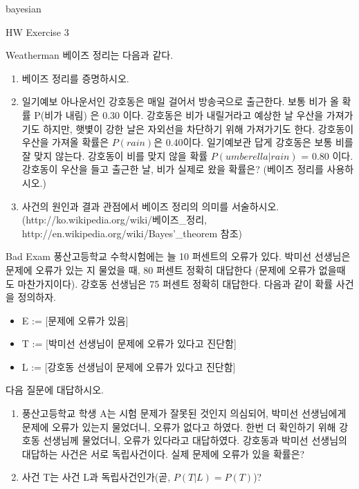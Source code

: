 \begin{edXchapter}{bayesian}

\begin{edXsection}{HW Exercise 3}

\begin{edXvertical}

\begin{edXproblem}{Weatherman}
베이즈 정리는 다음과 같다.
\begin{enumerate}
\item 베이즈 정리를 증명하시오.
\item 일기예보 아나운서인 강호동은 매일 걸어서 방송국으로 출근한다. 보통 비가 올 확률 P(비가 내림) 은  0.30 이다.
강호동은 비가 내릴거라고 예상한 날 우산을 가져가기도 하지만, 햇볓이 강한 날은 자외선을 차단하기 
위해 가져가기도 한다. 강호동이 우산을 가져올 확률은 $P(rain)$은 0.40이다. 일기예보관 답게 강호동은 보통 
비를 잘 맞지 않는다. 강호동이 비를 맞지 않을 확률 $P(umberella | rain)$ = 0.80 이다.
강호동이 우산을 들고 출근한 날, 비가 실제로 왔을 확률은? (베이즈 정리를 사용하시오.)
\item 사건의 원인과 결과 관점에서 베이즈 정리의 의미를 서술하시오.
(http://ko.wikipedia.org/wiki/베이즈_정리, http://en.wikipedia.org/wiki/Bayes'_theorem 참조)
\end{enumerate}
\end{edXproblem}

\begin{edXproblem}{Bad Exam}
풍산고등학교 수학시험에는 늘 10 퍼센트의 오류가 있다. 박미선 선생님은 문제에 오류가 있는 지 물었을 때,
80 퍼센트 정확히 대답한다 (문제에 오류가 없을때도 마찬가지이다). 강호동 선생님은 75 퍼센트 정확히 대답한다.
다음과 같이 확률 사건을 정의하자.
\begin{itemize}
\item E := [문제에 오류가 있음]
\item T := [박미선 선생님이 문제에 오류가 있다고 진단함]
\item L := [강호동 선생님이 문제에 오류가 있다고 진단함]
\end{itemize}

다음 질문에 대답하시오.
\begin{enumerate} 
\item 풍산고등학교 학생 A는 시험 문제가 잘못된 것인지 의심되어, 
박미선 선생님에게 문제에 오류가 있는지 물었더니, 오류가 없다고 하였다.
한번 더 확인하기 위해 강호동 선생님께 물었더니, 오류가 있다라고 대답하였다.
강호동과 박미선 선생님의 대답하는 사건은 서로 독립사건이다. 실제 문제에 오류가 있을 확률은?
\item 사건 T는 사건 L과 독립사건인가(곧, $P(T|L) = P(T)$)?
\end{enumerate}
\end{edXproblem}


\end{edXvertical}
\end{edXsection}
\end{edXchapter}
